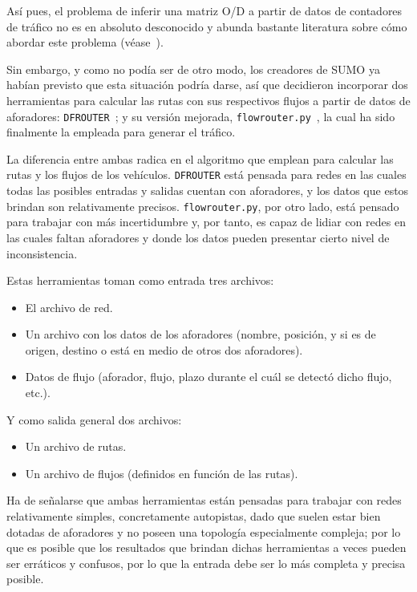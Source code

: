 Así pues, el problema de inferir una matriz O/D a partir de datos de contadores de tráfico no es en absoluto desconocido y abunda bastante literatura sobre cómo abordar este problema (véase~\cite{otto_anker_nielsen_two_1998}). 

Sin embargo, y como no podía ser de otro modo, los creadores de SUMO ya habían previsto que esta situación podría darse, así que decidieron incorporar dos herramientas para calcular las rutas con sus respectivos flujos a partir de datos de aforadores: \texttt{DFROUTER}~\cite{noauthor_dfrouter_nodate}; y su versión mejorada, \texttt{flowrouter.py}~\cite{noauthor_flowrouterpy_nodate,behrisch_route_2018}, la cual ha sido finalmente la empleada para generar el tráfico.

La diferencia entre ambas radica en el algoritmo que emplean para calcular las rutas y los flujos de los vehículos. \texttt{DFROUTER} está pensada para redes en las cuales todas las posibles entradas y salidas cuentan con aforadores, y los datos que estos brindan son relativamente precisos. \texttt{flowrouter.py}, por otro lado, está pensado para trabajar con más incertidumbre y, por tanto, es capaz de lidiar con redes en las cuales faltan aforadores y donde los datos pueden presentar cierto nivel de inconsistencia.

Estas herramientas toman como entrada tres archivos:

\begin{itemize}
    \item El archivo de red.
    \item Un archivo con los datos de los aforadores (nombre, posición, y si es de origen, destino o está en medio de otros dos aforadores).
    \item Datos de flujo (aforador, flujo, plazo durante el cuál se detectó dicho flujo, etc.).
\end{itemize}

Y como salida general dos archivos:

\begin{itemize}
    \item Un archivo de rutas.
    \item Un archivo de flujos (definidos en función de las rutas).
\end{itemize}

Ha de señalarse que ambas herramientas están pensadas para trabajar con redes relativamente simples, concretamente autopistas, dado que suelen estar bien dotadas de aforadores y no poseen una topología especialmente compleja; por lo que es posible que los resultados que brindan dichas herramientas a veces pueden ser erráticos y confusos, por lo que la entrada debe ser lo más completa y precisa posible.


